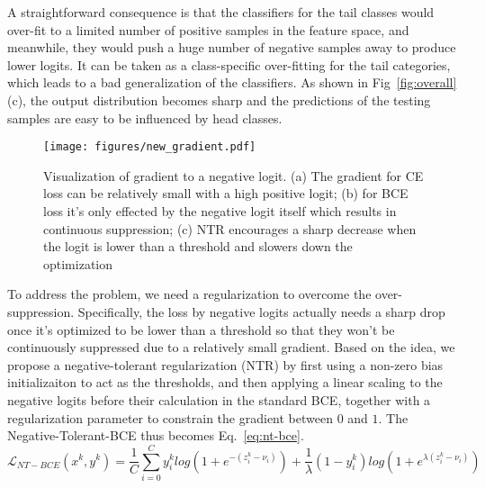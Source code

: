 \documentclass[runningheads]{llncs}
\begin{document}
A straightforward consequence is that the classifiers for the tail classes would over-fit to a limited number of positive samples in the feature space, and meanwhile, they would push a huge number of negative samples away to produce lower logits.
It can be taken as a class-specific over-fitting for the tail categories, which leads to a bad generalization of the classifiers.
As shown in Fig~\ref{fig:overall}(c),
the output distribution becomes sharp and the predictions of the testing samples are easy to be influenced by head classes.


\begin{figure}[t]
    \centering
    \texttt{[image: figures/new\_gradient.pdf]}\caption{
        Visualization of gradient to a negative logit. (a) The gradient for CE loss can be relatively small with a high positive logit; (b) for BCE loss it's only effected by the negative logit itself which results in continuous suppression; (c) NTR encourages a sharp decrease when the logit is lower than a threshold and slowers down the optimization
    }
    \label{fig:gradient} 
\end{figure}

To address the problem, we need a regularization to overcome the over-suppression.
Specifically, the loss by negative logits actually needs a sharp drop once it's optimized to be lower than a threshold so that they won't be continuously suppressed due to a relatively small gradient.
Based on the idea, we propose a negative-tolerant regularization (NTR) by first using a non-zero bias initializaiton to act as the thresholds, and then applying a linear scaling to the negative logits before their calculation in the standard BCE, together with a regularization parameter to constrain the gradient between $0$ and $1$.
The Negative-Tolerant-BCE thus becomes Eq.~\ref{eq:nt-bce}.
\begin{equation}
\mathcal{L}_{NT-BCE}(x^k, y^k) = \frac{1}{C}\sum_{i=0}^C{y^k_i log(1+e^{-(z^k_i-\nu_i)}) + \frac{1}{\lambda}(1 - y^k_i)log(1+e^{\lambda (z^k_i-\nu_i)})}
\label{eq:nt-bce}
\end{equation}
\end{document}
